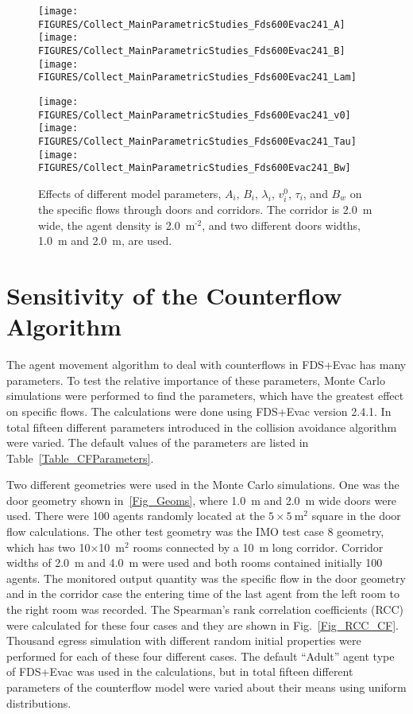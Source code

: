 \documentclass[12pt,a4paper,final,twoside]{stylevk}
\begin{document}
%
\begin{figure}[!tb]
  \centerline{ \texttt{[image: FIGURES/Collect\_MainParametricStudies\_Fds600Evac241\_A]}  
  \texttt{[image: FIGURES/Collect\_MainParametricStudies\_Fds600Evac241\_B]} 
  \texttt{[image: FIGURES/Collect\_MainParametricStudies\_Fds600Evac241\_Lam]} }  
  \centerline{ \texttt{[image: FIGURES/Collect\_MainParametricStudies\_Fds600Evac241\_v0]}  
  \texttt{[image: FIGURES/Collect\_MainParametricStudies\_Fds600Evac241\_Tau]} 
  \texttt{[image: FIGURES/Collect\_MainParametricStudies\_Fds600Evac241\_Bw]} }
  \caption{Effects of different model parameters, $A_i$, $B_i$,
    $\lambda_i$, $v^0_i$, $\tau_i$, and $B_w$ on the specific flows
    through doors and corridors.  The corridor is 2.0~m wide, the
    agent density is 2.0~$\mathrm{ \textrm{m}^\textrm{-2} }$, and two
    different doors widths, 1.0~m and 2.0~m, are used.
    \protect\hspace{200mm}}\label{Fig_Door1}
\end{figure}
%


\section{Sensitivity of the Counterflow Algorithm}\label{Sec_CFSensi}

\noindent The agent movement algorithm to deal with counterflows in
FDS+Evac has many parameters.  To test the relative importance of
these parameters, Monte Carlo simulations were performed to find the
parameters, which have the greatest effect on specific flows.  The
calculations were done using FDS+Evac version 2.4.1.  In total fifteen
different parameters introduced in the collision avoidance algorithm
were varied.  The default values of the parameters are listed in
Table~\ref{Table_CFParameters}.


Two different geometries were used in the Monte Carlo simulations.
One was the door geometry shown in~\ref{Fig_Geoms}, where 1.0~m and
2.0~m wide doors were used.  There were 100 agents randomly located at
the $5 \times 5 ~\mathrm{ \textrm{m}^\textrm{2} } $ square in the door
flow calculations.  The other test geometry was the IMO test case 8
geometry, which has two 10$\times$10~$\mathrm{m^2}$ rooms connected by
a 10~m long corridor.  Corridor widths of 2.0~m and 4.0~m were used
and both rooms contained initially 100 agents.  The monitored output
quantity was the specific flow in the door geometry and in the
corridor case the entering time of the last agent from the left room
to the right room was recorded.  The Spearman's rank correlation
coefficients (RCC) were calculated for these four cases and they are
shown in Fig.~\ref{Fig_RCC_CF}.  Thousand egress simulation with
different random initial properties were performed for each of these
four different cases.  The default ``Adult'' agent type of FDS+Evac
was used in the calculations, but in total fifteen different
parameters of the counterflow model were varied about their means
using uniform distributions.
\end{document}
